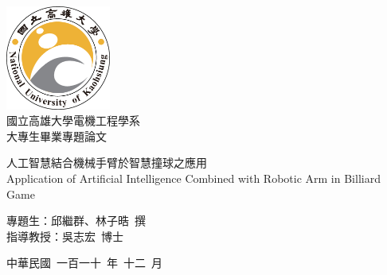 \fontsize{24}{20pt}\selectfont
\thispagestyle{empty}

\begin{center}
        \includegraphics[width=3.43cm,height=3.43cm]{graphs/logo/logo.eps}\\
	\huge 國立高雄大學電機工程學系 \\  大專生畢業專題論文
\end{center}

\vspace*{1cm}

\begin{center}
	\fontsize{24}{18pt}
	\LARGE 人工智慧結合機械手臂於智慧撞球之應用 \\

	Application of Artificial Intelligence Combined with Robotic Arm in Billiard Game
\end{center}

\vspace*{0.5cm}

\begin{center}
	\fontsize{24}{18pt}
	\LARGE 專題生：邱繼群、林子晧\  撰\\
	\LARGE 指導教授：吳志宏\ 博士 \\
\end{center}

\vspace*{0.5cm}

\begin{center}
	\LARGE 中華民國\ 一百一十\ 年\ 十二\ 月
\end{center}

\newpage

